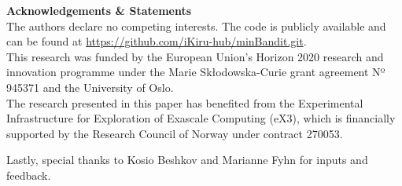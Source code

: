 
\hfill \break
\vspace {0.2cm}

\noindent \textbf{Acknowledgements \& Statements}\\
The authors declare no competing interests.
\hfill \break
The code is publicly available and can be found at
\url{https://github.com/iKiru-hub/minBandit.git}.\\
This research was funded by the European Union’s Horizon 2020 research and innovation programme under the Marie Skłodowska-Curie grant agreement Nº 945371 and the University of Oslo. \\
The research presented in this paper has benefited from the Experimental Infrastructure for Exploration of Exascale Computing (eX3), which is financially supported by the Research Council of Norway under contract 270053.

\noindent Lastly, special thanks to Kosio Beshkov and Marianne Fyhn for inputs and feedback.

\vspace {0.3cm}

